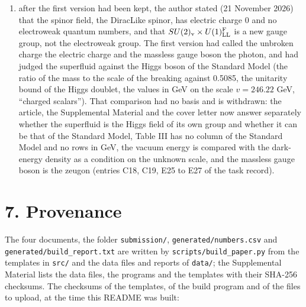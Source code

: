 \documentclass[
  10pt,
]{article}
\begin{document}
\begin{enumerate}
  the abstract, which pandoc does not write for a REVTeX document; the
  build now adds them;
\item
  after the first version had been kept, the author stated (21 November
  2026) that the spinor field, the DiracLike spinor, has electric charge
  0 and no electroweak quantum numbers, and that
  \(SU(2)_{\rm v}\times U(1)^{\rm F}_{\rm LL}\) is a new gauge group,
  not the electroweak group. The first version had called the unbroken
  charge the electric charge and the massless gauge boson the photon,
  and had judged the superfluid against the Higgs boson of the Standard
  Model (the ratio of the mass to the scale of the breaking against
  0.5085, the unitarity bound of the Higgs doublet, the values in GeV on
  the scale \(v=246.22\) GeV, ``charged scalars''). That comparison had
  no basis and is withdrawn: the article, the Supplemental Material and
  the cover letter now answer separately whether the superfluid is the
  Higgs field of its own group and whether it can be that of the
  Standard Model, Table III has no column of the Standard Model and no
  rows in GeV, the vacuum energy is compared with the dark-energy
  density as a condition on the unknown scale, and the massless gauge
  boson is the zeugon (entries C18, C19, E25 to E27 of the task record).
\end{enumerate}

\hypertarget{provenance}{%
\section{7. Provenance}\label{provenance}}

The four documents, the folder \texttt{submission/},
\texttt{generated/numbers.csv} and \texttt{generated/build\_report.txt}
are written by \texttt{scripts/build\_paper.py} from the templates in
\texttt{src/} and the data files and reports of \texttt{data/}; the
Supplemental Material lists the data files, the programs and the
templates with their SHA-256 checksums. The checksums of the templates,
of the build program and of the files to upload, at the time this README
was built:
\end{document}
